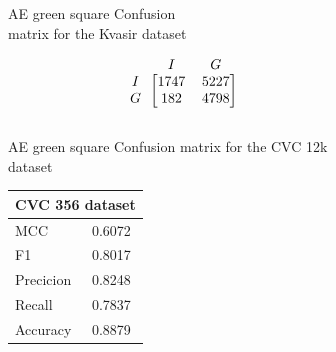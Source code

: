 \begin{figure}
\begin{subfigure}[b]{0.49\textwidth}
        
\caption{AE green square Confusion\\ matrix for the Kvasir dataset}
\label{mat:kvasir_CM_DN121_AE_SQUARE}
\end{subfigure}
\begin{subfigure}[b]{0.25\textwidth}
        \[
\begin{blockarray}{ccc}
& I & G  \\
\begin{block}{c[cc]}
 		I&1747 & 5227\\
        G&182  & 4798\\
\end{block}
\end{blockarray}
\]   
\caption{AE green square Confusion matrix for the CVC 12k dataset}
\label{mat:cvc12k_CM_DN121_AE_SQUARE}
\end{subfigure}
\caption{Confusion matrices for the three datasets}
\label{mat:CM_DN121_AE_SQUARE}
\begin{subfigure}[b]{0.25\textwidth}
\begin{tabular}{ll}      
        \toprule
        \multicolumn{2}{c}{CVC 356 dataset}        \\
        \midrule
        MCC 		& 0.6072 \\
        F1  		& 0.8017 \\
        Precicion  	& 0.8248 \\
        Recall      & 0.7837 \\
        Accuracy	& 0.8879 \\
        \bottomrule
            

\end{tabular}
\end{subfigure}
\end{figure}
